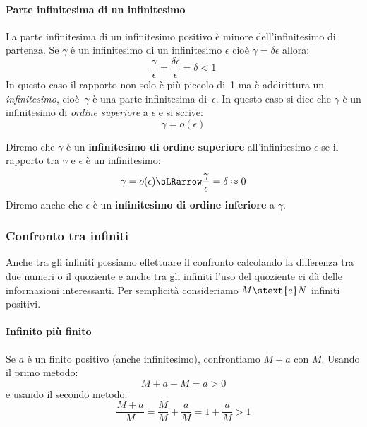 \paragraph{Parte infinitesima di un infinitesimo}
La parte infinitesima di un infinitesimo positivo è minore 
dell'infinitesimo di partenza. Se \(\gamma\) è un infinitesimo di 
un infinitesimo \(\epsilon\) cioè \(\gamma= \delta \epsilon\) allora:
\[\frac{\gamma}{\epsilon} = \frac{\delta \epsilon}{\epsilon}=\delta < 1\]
In questo caso il rapporto non solo è più piccolo di~1 ma è addirittura un 
\emph{infinitesimo}, 
cioè~\(\gamma\) è una parte infinitesima di~\(\epsilon\). 
In questo caso 
si dice che \(\gamma\) è un infinitesimo di \emph{ordine superiore} a 
\(\epsilon\) e si scrive:
\[\gamma=o(\epsilon)\]
\begin{definizione}
Diremo che \(\gamma\) è un \textbf{infinitesimo di ordine superiore} 
all'infinitesimo \(\epsilon\) se 
il rapporto tra \(\gamma\) e \(\epsilon\) è un infinitesimo:
\[\gamma=o(\epsilon) \sLRarrow \frac{\gamma}{\epsilon}=\delta
\approx 0\]
Diremo anche che 
\(\epsilon\) è un \textbf{infinitesimo di ordine inferiore} a \(\gamma\).
\end{definizione}

\subsubsection{Confronto tra infiniti}
\label{subsubsec:insnum_confrontoreali}

Anche tra gli infiniti possiamo effettuare il confronto calcolando la 
differenza tra due numeri o il quoziente e anche tra gli infiniti l'uso del 
quoziente ci dà delle informazioni interessanti.
Per semplicità consideriamo \(M \stext{e} N\) infiniti positivi.


\paragraph{Infinito più finito}
Se \(a\) è un finito positivo (anche infinitesimo), confrontiamo \(M+a\) 
con \(M\). 
Usando il primo metodo:
\[M+a-M = a > 0\]
e usando il secondo metodo: 
\[\frac{M+a}{M} =
  \frac{M}{M} + \frac{a}{M} = 
  1 + \frac{a}{M} > 1\]
